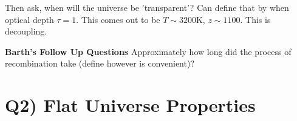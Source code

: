 \documentclass[\main/main.tex]{subfiles}
\begin{document}
	    Then ask, when will the universe be 'transparent'? Can define that by when optical depth $\tau = 1$. This comes out to be $T\sim3200$K, $z\sim1100$. This is decoupling.
	    
	    \textbf{Barth's Follow Up Questions}
	     Approximately how long did the process of recombination take (define however is convenient)?
	


	

	

	

	



\newpage
\section{Q2) Flat Universe Properties} %
\label{sec:q2_flat_universe_properties}
\end{document}

